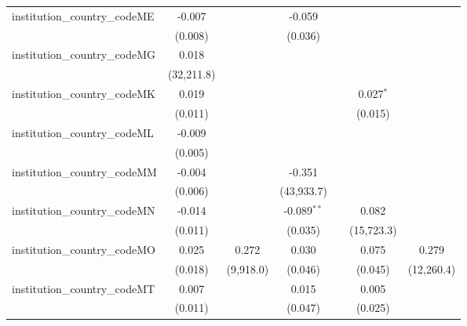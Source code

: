 \begin{tabular}{lcccccc}
   institution\_country\_codeME          & -0.007         &               & -0.059        &              &              &   \\   
                                         & (0.008)        &               & (0.036)       &              &              &   \\   
   institution\_country\_codeMG          & 0.018          &               &               &              &              &   \\   
                                         & (32,211.8)     &               &               &              &              &   \\   
   institution\_country\_codeMK          & 0.019          &               &               &              & 0.027$^{*}$  &   \\   
                                         & (0.011)        &               &               &              & (0.015)      &   \\   
   institution\_country\_codeML          & -0.009         &               &               &              &              &   \\   
                                         & (0.005)        &               &               &              &              &   \\   
   institution\_country\_codeMM          & -0.004         &               & -0.351        &              &              &   \\   
                                         & (0.006)        &               & (43,933.7)    &              &              &   \\   
   institution\_country\_codeMN          & -0.014         &               & -0.089$^{**}$ &              & 0.082        &   \\   
                                         & (0.011)        &               & (0.035)       &              & (15,723.3)   &   \\   
   institution\_country\_codeMO          & 0.025          & 0.272         & 0.030         &              & 0.075        & 0.279\\   
                                         & (0.018)        & (9,918.0)     & (0.046)       &              & (0.045)      & (12,260.4)\\   
   institution\_country\_codeMT          & 0.007          &               & 0.015         &              & 0.005        &   \\   
                                         & (0.011)        &               & (0.047)       &              & (0.025)      &   \\   

\end{tabular}
